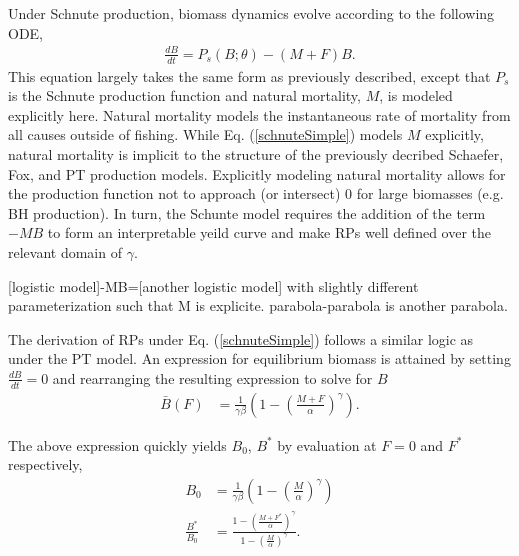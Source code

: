 %
Under Schnute production, biomass dynamics evolve according to the following ODE,
%
\begin{align}
\frac{dB}{dt} = P_s(B;\theta) - (M+F)B. \label{schnuteSimple}
\end{align}
%
This equation largely takes the same form as previously described, except
that $P_s$ is the Schnute production function and natural mortality, $M$, is modeled
explicitly here. %
Natural mortality models the instantaneous rate of mortality from all causes
outside of fishing. While Eq. (\ref{schnuteSimple}) models $M$ explicitly,
natural mortality is implicit to the structure of the previously decribed
Schaefer, Fox, and PT production models. Explicitly modeling natural mortality
allows for the production function not to approach (or intersect) 0 for large
biomasses (e.g. BH production). In turn, the Schunte model requires the addition
of the term $-MB$ to form an interpretable yeild curve and make RPs well defined
over the relevant domain of $\gamma$.

{\color{red} [logistic model]-MB=[another logistic model] with slightly different 
parameterization such that M is explicite. parabola-parabola is another parabola.}




%
The derivation of RPs under Eq. (\ref{schnuteSimple}) follows a similar logic
as under the PT model. An expression for equilibrium biomass is attained by
setting $\frac{dB}{dt}=0$ and rearranging the resulting expression to solve
for $B$
%
\begin{align}
\bar{B}(F) &= \frac{1}{\gamma \beta}\left(1-\left(\frac{M+F}{\alpha}\right)^\gamma\right).
\label{BsEq}
\end{align}

%
The above expression quickly yields $B_0$, $B^*$ by evaluation at $F=0$ and $F^*$ respectively,
\begin{align}
B_0 &= \frac{1}{\gamma \beta}\left(1-\left(\frac{M}{\alpha}\right)^\gamma\right) \label{B0S}\\
\frac{B^*}{B_0} &= \frac{1-\left(\frac{M+F^*}{\alpha}\right)^\gamma}{ 1-\left(\frac{M}{\alpha}\right)^\gamma }. \label{BratS}
\end{align}


